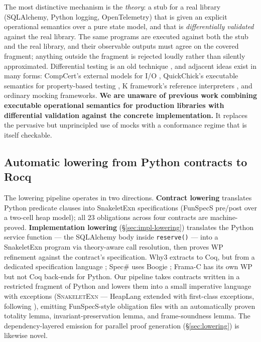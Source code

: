 \documentclass[11pt,a4paper]{article}
\begin{document}
The most distinctive mechanism is the \emph{theory}: a stub for a
real library (SQLAlchemy, Python logging, OpenTelemetry) that is
given an explicit operational semantics over a pure state model, and
that is \emph{differentially validated} against the real library.
The same programs are executed against both the stub and the real
library, and their observable outputs must agree on the covered
fragment; anything outside the fragment is rejected loudly rather
than silently approximated.      Differential testing is an old technique
\cite{McKeeman98}, and adjacent ideas exist in many forms:
CompCert's external models for I/O \cite{Leroy16}, QuickChick's
executable semantics for property-based testing \cite{Paraskevopoulou22},
K framework's reference interpreters \cite{Rosu13}, and ordinary
mocking frameworks.  \textbf{We are unaware of previous work combining
executable operational semantics for production libraries with
differential validation against the concrete implementation.}  It replaces the pervasive but unprincipled
use of mocks with a conformance regime that is itself checkable.

\subsection{Automatic lowering from Python contracts to Rocq}
\label{sec:contrib-lowering}

The lowering pipeline operates in two directions.  \textbf{Contract
lowering} translates Python predicate clauses into SnakeletExn
specifications (FunSpecS pre/post over a two-cell heap model); all 23
obligations across four contracts are machine-proved.  \textbf{Implementation
lowering} (\S\ref{sec:impl-lowering}) translates the Python service
function --- the SQLAlchemy body inside \texttt{reserve()} --- into a
SnakeletExn program via theory-aware call resolution, then proves
WP refinement against the contract's specification.  Why3 extracts to
Coq, but from a dedicated specification language
\cite{Filliatre13}; Spec\# uses Boogie \cite{Leino10}; Frama-C has
its own WP but not Coq back-ends for Python.  Our pipeline takes
contracts written in a restricted fragment of Python and lowers them
into a small imperative language with exceptions (\textsc{SnakeletExn}
--- HeapLang extended with first-class exceptions, following
\cite{VanCollem2026}), emitting FunSpecS-style obligation files with
an automatically proven totality lemma, invariant-preservation lemma,
and frame-soundness lemma.  The dependency-layered emission for
parallel proof generation (\S\ref{sec:lowering}) is likewise novel.
\end{document}
